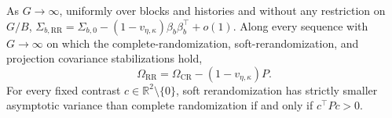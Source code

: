 As \(G\to\infty\), uniformly over blocks and histories and without any restriction on \(G/B\), \(\Sigma_{b,\mathrm{RR}}=\Sigma_{b,0}-(1-v_{\eta,\kappa})\beta_b\beta_b^\top+o(1)\). Along every sequence with \(G\to\infty\) on which the complete-randomization, soft-rerandomization, and projection covariance stabilizations hold,
\[
\Omega_{\mathrm{RR}}=\Omega_{\mathrm{CR}}-(1-v_{\eta,\kappa})P.
\]
For every fixed contrast \(c\in\mathbb R^2\setminus\{0\}\), soft rerandomization has strictly smaller asymptotic variance than complete randomization if and only if \(c^\top Pc>0\).